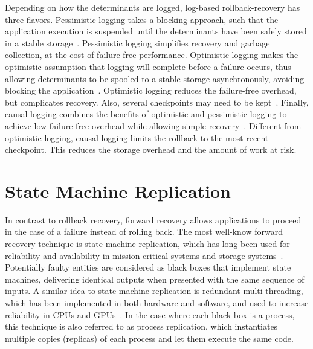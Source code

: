 Depending on how the determinants are
logged, log-based rollback-recovery has three flavors. Pessimistic logging takes a blocking approach, such that 
the application execution is suspended until the determinants have been safely stored in a stable storage~\cite{huang1995optimistic,johnson1987sender,juang1991crash}.
Pessimistic logging simplifies recovery and garbage collection, at the cost of failure-free performance.
Optimistic logging makes the optimistic assumption that logging
will complete before a failure occurs, thus allowing determinants to be spooled to a stable storage asynchronously, avoiding blocking the application~\cite{strom1985optimistic,sistla1989efficient,smith1996minimizing}. Optimistic
logging reduces the failure-free overhead,
but complicates recovery. 
Also, several checkpoints may need to be
kept~\cite{Elnozahy:02:Survey}.
Finally, 
causal logging combines the benefits of optimistic and
pessimistic logging to achieve low failure-free overhead
while allowing simple recovery~\cite{meneses2011evaluation,lee1998efficient,alvisi1996trade}. Different from optimistic logging, causal logging limits
the rollback to the most recent checkpoint.
This reduces the storage overhead and the amount of work at risk. 





\section{State Machine Replication}
In contrast to rollback recovery, forward recovery allows applications to proceed in the case of a failure instead of rolling back. The most well-know forward recovery technique is state machine replication, 
which has long been used for reliability and availability in mission critical systems and storage systems~\cite{schneider_1990_tutorial,Sousa2005,5470865}. 
Potentially faulty entities are considered as black boxes that implement state machines, delivering identical outputs when presented with the same sequence of inputs. A similar idea to state machine replication is redundant multi-threading, which has been implemented in both hardware and software, and used to increase reliability in CPUs and GPUs~\cite{reinhardt2000transient,Wadden:2014:RDE:2665671.2665686}. In the case where each black box is a process, this technique is also referred to as process replication, which instantiates multiple copies (replicas) of each process and let them execute the same code. 

